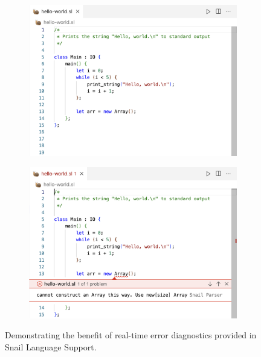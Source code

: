 \documentclass{article}
\begin{document}
\begin{figure}[t]
    \begin{subfigure}{0.45\textwidth}
        \begin{center}
            \includegraphics[width=\textwidth]{screenshots/dev-no-diagnostics-light.png}
            \label{fig:dev-no-diagnostics}
        \end{center}
    \end{subfigure}
    \hspace{0.05\textwidth}
    \begin{subfigure}{0.45\textwidth}
        \begin{center}
            \includegraphics[width=\textwidth]{screenshots/dev-with-diagnostics-light.png}
            \label{fig:dev-with-diagnostics}
        \end{center}
    \end{subfigure}
    \caption{
        \centering
            Demonstrating the benefit of real-time error diagnostics provided in Snail Language Support.
        }
    \label{fig:dev-diagnostics}
\end{figure}
\end{document}
